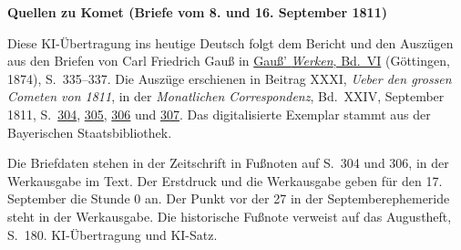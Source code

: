 \clearpage\thispagestyle{empty}
\begin{center}\textbf{Quellen zu Komet (Briefe vom 8. und 16. September 1811)}\end{center}
\noindent Diese KI-Übertragung ins heutige Deutsch folgt dem Bericht und den Auszügen aus den Briefen von Carl Friedrich Gauß in \href{https://gdz.sub.uni-goettingen.de/id/PPN236007467}{Gauß’ \textit{Werken}, Bd.~VI} (Göttingen, 1874), S.~335--337. Die Auszüge erschienen in Beitrag XXXI, \textit{Ueber den grossen Cometen von 1811}, in der \textit{Monatlichen Correspondenz}, Bd.~XXIV, September 1811, S.~\href{https://api.digitale-sammlungen.de/iiif/image/v2/bsb10538613_00314/full/1600,/0/default.jpg}{304}, \href{https://api.digitale-sammlungen.de/iiif/image/v2/bsb10538613_00315/full/1600,/0/default.jpg}{305}, \href{https://api.digitale-sammlungen.de/iiif/image/v2/bsb10538613_00316/full/1600,/0/default.jpg}{306} und \href{https://api.digitale-sammlungen.de/iiif/image/v2/bsb10538613_00317/full/1600,/0/default.jpg}{307}. Das digitalisierte Exemplar stammt aus der Bayerischen Staatsbibliothek.
\par\smallskip\noindent Die Briefdaten stehen in der Zeitschrift in Fußnoten auf S.~304 und 306, in der Werkausgabe im Text. Der Erstdruck und die Werkausgabe geben für den 17. September die Stunde 0 an. Der Punkt vor der 27 in der Septemberephemeride steht in der Werkausgabe. Die historische Fußnote verweist auf das Augustheft, S.~180. KI-Übertragung und KI-Satz.
\clearpage
